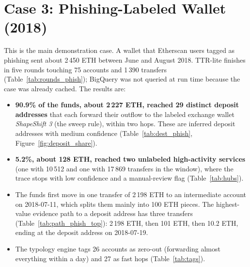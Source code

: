 
\section{Case 3: Phishing-Labeled Wallet (2018)}
\label{sec:phish}
This is the main demonstration case. A wallet that Etherscan users tagged as phishing sent about 2\,450 ETH between June and August 2018. TTR-lite finishes in five rounds touching 75 accounts and 1\,390 transfers (Table~\ref{tab:rounds_phish}); BigQuery was not queried at run time because the case was already cached. The results are:
\begin{itemize}
\item \textbf{90.9\% of the funds, about 2\,227 ETH, reached 29 distinct deposit addresses} that each forward their outflow to the labeled exchange wallet \emph{ShapeShift 3} (the sweep rule), within two hops. These are inferred deposit addresses with medium confidence (Table~\ref{tab:dest_phish}, Figure~\ref{fig:deposit_share}).
\item \textbf{5.2\%, about 128 ETH, reached two unlabeled high-activity services} (one with 10\,512 and one with 17\,869 transfers in the window), where the trace stops with low confidence and a manual-review flag (Table~\ref{tab:hubs}).
\item The funds first move in one transfer of 2\,198 ETH to an intermediate account on 2018-07-11, which splits them mainly into 100 ETH pieces. The highest-value evidence path to a deposit address has three transfers (Table~\ref{tab:path_phish_top}): 2\,198 ETH, then 101 ETH, then 10.2 ETH, ending at the deposit address  on 2018-07-19.
\item The typology engine tags 26 accounts as zero-out (forwarding almost everything within a day) and 27 as fast hops (Table~\ref{tab:tags}).
\end{itemize}

